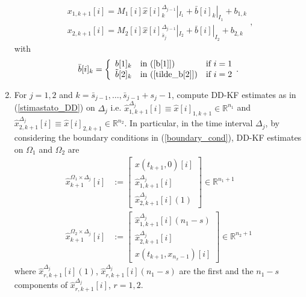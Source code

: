 \documentclass[smallcondensed]{svjour3}
\begin{document}
\begin{enumerate}
\begin{equation}
\begin{array}{ll}
x_{1,k+1}[i]=M_{1}[i]\widehat{x}[i]_{k}^{\Delta_{j-1}}|_{I_{1}}+\bar{b}[i]_{k}|_{I_{1}}+b_{1,k}\\
x_{2,k+1}[i]=M_{2}[i]\widehat{x}[i]_{\bar{s}_{j}}^{\Delta_{j-1}}|_{I_{2}}+\bar{b}[i]|_{I_{2}}+b_{2,k}
\end{array},
 \end{equation}
 with 
 \begin{equation}
 \bar{b}[i]_{k}=\left\{\begin{array}{lll}
 b[1]_{k} & \textrm{in (\ref{b[1]})} & \textrm{if $i=1$}\\
  \tilde{b}[2]_{k} &\textrm{in (\ref{tilde_b[2]})} & \textrm{if $i=2$} 
 \end{array}.\right.
 \end{equation}
\item For $j=1,2$ and $k=\bar{s}_{j-1},\ldots,\bar{s}_{j-1}+s_{j}-1$, compute DD-KF estimates as in (\ref{stimastato_DD}) on $\Delta_{j}$ i.e. $ \widehat{x}_{1,k+1}^{\Delta_{j}}[i] \equiv \widehat{x}[i]_{1,k+1}\in \mathbb{R}^{n_{1}}$ and $\widehat{x}_{2,k+1}^{\Delta_{j}}[i] \equiv \widehat{x}[i]_{2,k+1}\in \mathbb{R}^{n_{2}}$. In particular, in the time interval $\Delta_{j}$, by considering the boundary conditions in (\ref{boundary_cond}), DD-KF estimates on $\Omega_{1}$ and $\Omega_{2}$ are 
\begin{equation}
\begin{array}{ll}
\widehat{x}_{k+1}^{\Omega_{1}\times \Delta_{j}}[i] &:=\left[\begin{array}{ll}
{x}(t_{k+1},0)[i]\\
\widehat{x}_{1,k+1}^{\Delta_{j}}[i]\\
\widehat{x}_{2,k+1}^{\Delta_{j}}[i](1)
\end{array}\right]\in \mathbb{R}^{n_{1}+1} \\
\widehat{x}_{k+1}^{\Omega_{2}\times \Delta_{j}}[i] &:=\left[\begin{array}{ll}
\widehat{x}_{1,k+1}^{\Delta_{j}}[i](n_{1}-s)\\
\widehat{x}_{2,k+1}^{\Delta_{j}}[i]\\
{x}(t_{k+1},x_{n_{x}-1})[i]
\end{array}\right]\in \mathbb{R}^{n_{2}+1} 
\end{array}
\end{equation}
where $\widehat{x}_{r,k+1}^{\Delta_{j}}[i](1)$, $\widehat{x}_{r,k+1}^{\Delta_{j}}[i]( n_{1}-s)$ are the first and the $n_{1}-s$ components of $\widehat{x}_{r,k+1}^{\Delta_{j}}[i]$, $r=1,2$.

\end{enumerate}
\end{document}

